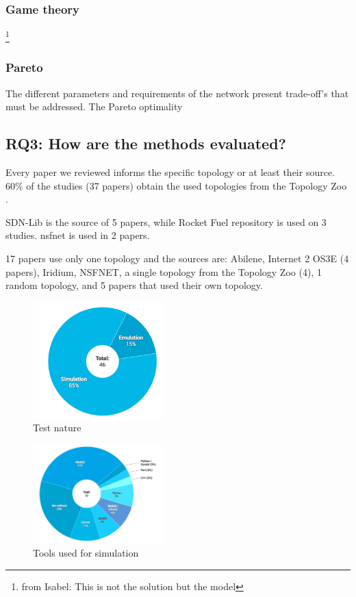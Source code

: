 \documentclass{IEEEtran}
\newcommand\fia[1]{{\color{red}\footnote{\color{red}from Isabel: #1}}} %
\begin{document}
\subsubsection{Game theory}\fia{This is not the solution but the model}

\subsubsection{Pareto}
The different parameters and requirements of the network present trade-off's that must be addressed.  The Pareto optimality 


\subsection{RQ3: How are the methods evaluated?}

Every paper we reviewed informs the specific topology or at least their source. 60\% of the studies (37 papers) obtain the used topologies from the Topology Zoo \cite{topologyzoo}. 

SDN-Lib \cite{sdnlib} is the source of 5 papers, while Rocket Fuel repository \cite{rf} is used on 3 studies. nsfnet is used in 2 papers. 

17 papers use only one topology and the sources are: Abilene, Internet 2 OS3E (4 papers), Iridium, NSFNET, a single topology from the Topology Zoo (4), 1 random topology, and 5 papers that used their own topology.



\begin{figure}
    \centering
    \includegraphics[width=0.45\textwidth]{Pictures/Test nature.png}
    \caption{Test nature}
    \label{fig:test_nature}
\end{figure}

\begin{figure}
    \centering
    \includegraphics[width=0.45\textwidth]{Pictures/Simulations.png}
    \caption{Tools used for simulation}
    \label{fig:simulation}
\end{figure}
\end{document}
